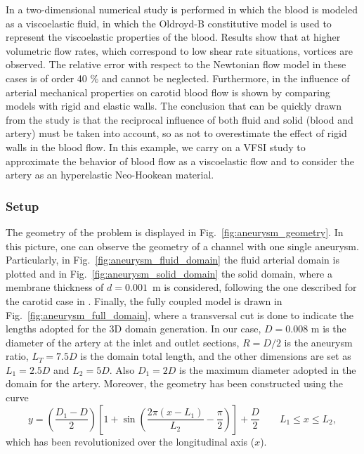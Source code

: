 \documentclass[11pt,english]{article}
\begin{document}
In \cite{elhanafy2019numerical} a two-dimensional numerical study is performed in which the blood is modeled as a viscoelastic fluid, in which the Oldroyd-B constitutive model is used to represent the viscoelastic properties of the blood. Results show that at higher volumetric flow rates, which correspond to low shear rate situations, vortices are observed. The relative error with respect to the Newtonian flow model in these cases is of order 40 \% and cannot be neglected. Furthermore, in \cite{lopes2019} the influence of arterial mechanical properties on carotid blood flow is shown by comparing models with rigid and elastic walls. The conclusion that can be quickly drawn from the study is that the reciprocal influence of both fluid and solid (blood and artery) must be taken into account, so as not to overestimate the effect of rigid walls in the blood flow. In this example, we carry on a VFSI study to approximate the behavior of blood flow as a viscoelastic flow and to consider the artery as an hyperelastic Neo-Hookean material. 

\subsubsection{Setup}

The geometry of the problem  is displayed in Fig.~\ref{fig:aneurysm_geometry}. In this picture, one can observe the geometry of a channel with one single aneurysm. Particularly, in Fig.~\ref{fig:aneurysm_fluid_domain} the fluid arterial domain is plotted and in Fig.~\ref{fig:aneurysm_solid_domain} the solid domain, where a membrane thickness of $d=0.001$~m is considered, following the one described for the carotid case in \cite{lopes2019}. Finally, the fully coupled model is drawn in Fig.~\ref{fig:aneurysm_full_domain}, where a transversal cut is done to indicate the lengths adopted for the 3D domain generation. In our case, $D=0.008$ m is the diameter of the artery at the inlet and outlet sections, $R=D/2$ is the aneurysm ratio, $L_T=7.5D$ is the domain total length, and the other dimensions are set as $L_1=2.5D$ and $L_2=5D$. Also $D_1=2D$ is the maximum diameter adopted in the domain for the artery. Moreover, the geometry has been constructed using the curve
\begin{equation}
    y=\left(\dfrac{D_1-D}{2}\right)\left[1+\sin\left(\dfrac{2\pi(x-L_1)}{L_2}-\dfrac{\pi}{2}\right)\right]+\dfrac{D}{2} \qquad L_1\leq x \leq L_2,
    \label{eq:aneurysm_curve_equation}
\end{equation}
which has been revolutionized over the longitudinal axis ($x$).
\end{document}
